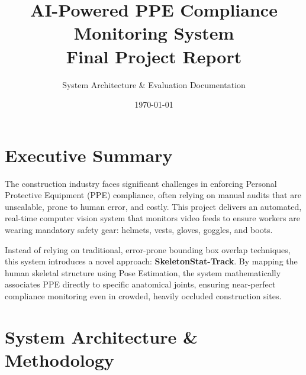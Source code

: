 \documentclass[12pt,a4paper]{article}
\title{\textbf{AI-Powered PPE Compliance Monitoring System}\\ \Large Final Project Report}
\author{System Architecture \& Evaluation Documentation}
\date{\today}
\begin{document}
\maketitle

\section*{Executive Summary}
The construction industry faces significant challenges in enforcing Personal Protective Equipment (PPE) compliance, often relying on manual audits that are unscalable, prone to human error, and costly. This project delivers an automated, real-time computer vision system that monitors video feeds to ensure workers are wearing mandatory safety gear: helmets, vests, gloves, goggles, and boots.

Instead of relying on traditional, error-prone bounding box overlap techniques, this system introduces a novel approach: \textbf{SkeletonStat-Track}. By mapping the human skeletal structure using Pose Estimation, the system mathematically associates PPE directly to specific anatomical joints, ensuring near-perfect compliance monitoring even in crowded, heavily occluded construction sites.

\vspace{0.5cm}
\noindent{}

\section{System Architecture \& Methodology}
\end{document}
